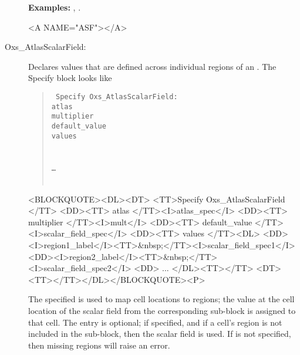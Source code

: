\begin{description}
\textbf{Examples:} , .


\begin{rawhtml}<A NAME="ASF"></A>\end{rawhtml}%
%
\item[Oxs\_AtlasScalarField:\label{item:AtlasScalarField}]
   Declares values that are defined across individual regions of an
   .  The Specify block looks like
      \begin{latexonly}
      \begin{quote}\tt
      Specify Oxs\_AtlasScalarField: \ocb\\
       \bi atlas \\
       \bi multiplier \\
       \bi default\_value \\
       \bi values \ocb\\
         \bi\bi{}\\
         \bi\bi{}\\
         \bi\bi \ldots\\
       \bi\ccb\\
      \ccb
      \end{quote}
      \end{latexonly}
      \begin{rawhtml}<BLOCKQUOTE><DL><DT>
      <TT>Specify Oxs_AtlasScalarField {</TT>
      <DD><TT> atlas </TT><I>atlas_spec</I>
      <DD><TT> multiplier </TT><I>mult</I>
      <DD><TT> default_value </TT><I>scalar_field_spec</I>
      <DD><TT> values {</TT><DL>
          <DD><I>region1_label</I><TT>&nbsp;</TT><I>scalar_field_spec1</I>
          <DD><I>region2_label</I><TT>&nbsp;</TT><I>scalar_field_spec2</I>
          <DD> ...
      </DL><TT>}</TT>
      <DT><TT>}</TT></DL></BLOCKQUOTE><P>
      \end{rawhtml}

   The specified  is used to map cell locations to
   regions; the value at the cell location of the scalar field from the
   corresponding  sub-block is assigned to that cell.
   The  entry is optional; if specified, and if
   a cell's region is not included in the  sub-block, then
   the  scalar field is used.  If 
   is not specified, then missing regions will raise an error.


\end{description}
